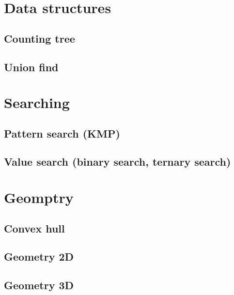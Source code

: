 \documentclass[a4paper, 11pt]{article}
\def\path{..}
\begin{document}
\clearpage
\section{Data structures}
\subsection{Counting tree}


\clearpage
\subsection{Union find}


\clearpage
\section{Searching}
\subsection{Pattern search (KMP)}


\clearpage
\subsection{Value search (binary search, ternary search)}


\clearpage
\section{Geomptry}
\subsection{Convex hull}


\clearpage
\subsection{Geometry 2D}


\clearpage
\subsection{Geometry 3D}

\end{document}
